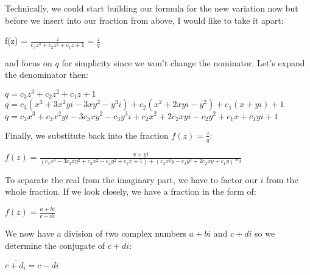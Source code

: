 \documentclass[]{article}
\begin{document}
\noindent Technically, we could start building our formula for the new variation now but before we insert into our fraction from above, I would like to take it apart:

\begin{flushleft}
	\hspace{20pt} f(z) = $\frac{z}{c_3z^3 + c_2z^2 + c_1z + 1} = \frac{z}{q}$
\end{flushleft}

\noindent and focus on $q$ for simplicity since we won't change the nominator. Let's expand the denominator then:

\begin{flushleft}
	\hspace{20pt} $q = c_3z^3 + c_2z^2 + c_1z + 1$ \\
	\medskip
	\hspace{20pt} $q = c_3(x^3 + 3x^2yi - 3xy^2 - y^3i) + c_2(x^2 + 2xyi - y^2) + c_1(x + yi) + 1$ \\
	\medskip
	\hspace{20pt} $q = c_3x^3 + c_3x^2yi - 3c_3xy^2 - c_3y^3i + c_2x^2 + 2c_2xyi - c_2y^2 + c_1x + c_1yi + 1 $
\end{flushleft}

\pagebreak

\noindent Finally, we substitute back into the fraction $f(z) = \frac{z}{q}$:

\begin{flushleft}
	\hspace{20pt} $f(z) = \frac{x + yi}{(c_3x^3 - 3c_3xy^2 + c_2x^2 - c_2y^2 + c_1x + 1) + (c_3x^2y - c_3y^3 + 2c_2xy + c_1y) * i}$ \\
\end{flushleft}

\noindent To separate the real from the imaginary part, we have to factor our $i$ from the whole fraction. If we look closely, we have a fraction in the form of:

\begin{flushleft}
	\hspace{20pt} $f(z) = \frac{a + bi}{c + di}$ \\
\end{flushleft}

\noindent We now have a division of two complex numbers $a + bi$ and $c + di$ so we determine the conjugate of $c + di$:

\begin{flushleft}
	\hspace{20pt} $\overline{c+d_i} = c - di $ \\
\end{flushleft}
\end{document}
